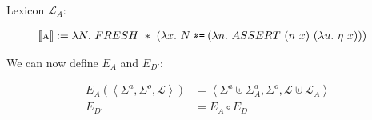 Lexicon $\mathcal{L}_A$:

\begin{align*}
  \lex{a}{\lambda N.\ FRESH\ *\ (\lambda x.\ N \hsbind (\lambda n.\ ASSERT\ (n\ x)\ (\lambda u.\ \eta\ x)))}
\end{align*}

We can now define $E_A$ and $E_{D'}$:

\begin{align*}
E_A(\left< \Sigma^a, \Sigma^o, \mathcal{L} \right>) &= \left< \Sigma^a \uplus \Sigma^a_A, \Sigma^o, \mathcal{L} \uplus \mathcal{L}_A \right> \\
E_{D'} &= E_A \circ E_D
\end{align*}
